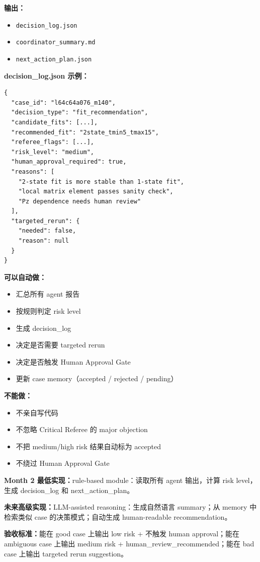 \documentclass[11pt,a4paper,fontset=fandol]{ctexart}
\begin{document}
\textbf{输出：}
\begin{itemize}
  \item \texttt{decision\_log.json}
  \item \texttt{coordinator\_summary.md}
  \item \texttt{next\_action\_plan.json}
\end{itemize}

\textbf{decision\_log.json 示例：}
\begin{lstlisting}
{
  "case_id": "l64c64a076_m140",
  "decision_type": "fit_recommendation",
  "candidate_fits": [...],
  "recommended_fit": "2state_tmin5_tmax15",
  "referee_flags": [...],
  "risk_level": "medium",
  "human_approval_required": true,
  "reasons": [
    "2-state fit is more stable than 1-state fit",
    "local matrix element passes sanity check",
    "Pz dependence needs human review"
  ],
  "targeted_rerun": {
    "needed": false,
    "reason": null
  }
}
\end{lstlisting}

\textbf{可以自动做：}
\begin{itemize}
  \item 汇总所有 agent 报告
  \item 按规则判定 risk level
  \item 生成 decision\_log
  \item 决定是否需要 targeted rerun
  \item 决定是否触发 Human Approval Gate
  \item 更新 case memory（accepted / rejected / pending）
\end{itemize}

\textbf{不能做：}
\begin{itemize}
  \item 不亲自写代码
  \item 不忽略 Critical Referee 的 major objection
  \item 不把 medium/high risk 结果自动标为 accepted
  \item 不绕过 Human Approval Gate
\end{itemize}

\textbf{Month 2 最低实现：}rule-based module：读取所有 agent 输出，计算 risk level，生成 decision\_log 和 next\_action\_plan。

\textbf{未来高级实现：}LLM-assisted reasoning：生成自然语言 summary；从 memory 中检索类似 case 的决策模式；自动生成 human-readable recommendation。

\textbf{验收标准：}能在 good case 上输出 low risk + 不触发 human approval；能在 ambiguous case 上输出 medium risk + human\_review\_recommended；能在 bad case 上输出 targeted rerun suggestion。
\end{document}
